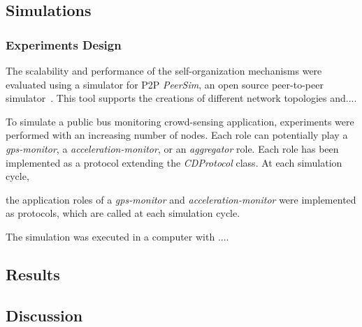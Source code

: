 
\subsection{Simulations}

\subsubsection{Experiments Design}



The scalability and performance of the self-organization mechanisms were evaluated using a simulator for P2P  \textit{PeerSim}, an open source peer-to-peer simulator~\cite{p2p09-peersim}. This tool supports the creations of different network topologies and.... 

To simulate a public bus monitoring crowd-sensing application, experiments were performed with an increasing number of nodes. Each role can potentially play a \textit{gps-monitor}, a \textit{acceleration-monitor}, or an \textit{aggregator} role. Each role has been implemented as a protocol extending the \textit{CDProtocol} class. At each simulation cycle, 

the application roles of a \textit{gps-monitor} and \textit{acceleration-monitor} were implemented as protocols, which are called at each simulation cycle. 

The simulation was executed in a computer with .... 

\subsection{Results}

\subsection{Discussion}